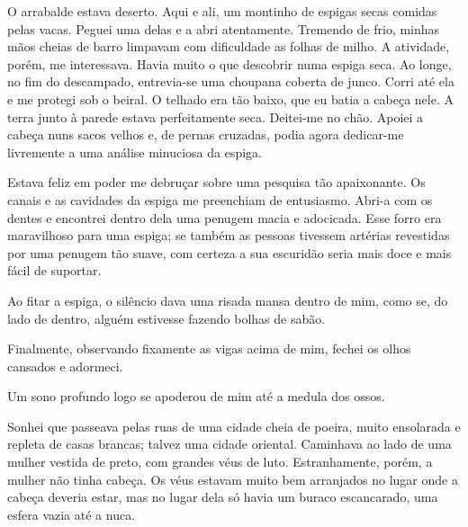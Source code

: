 O arrabalde estava deserto. Aqui e ali, um montinho de espigas secas comidas
pelas vacas. Peguei uma delas e a abri atentamente. Tremendo de frio, minhas
mãos cheias de barro limpavam com dificuldade as folhas de milho. A
atividade, porém, me interessava. Havia muito o que descobrir numa espiga
seca. Ao longe, no fim do descampado, entrevia-se uma choupana coberta de
junco. Corri até ela e me protegi sob o beiral. O telhado era tão baixo, que
eu batia a cabeça nele. A terra junto à parede estava perfeitamente seca.
Deitei-me no chão. Apoiei a cabeça nuns sacos velhos e, de pernas cruzadas,
podia agora dedicar-me livremente a uma análise minuciosa da espiga.

Estava feliz em poder me debruçar sobre uma pesquisa tão apaixonante. Os
canais e as cavidades da espiga me preenchiam de entusiasmo. Abri-a com os
dentes e encontrei dentro dela uma penugem macia e adocicada. Esse forro era
maravilhoso para uma espiga; se também as pessoas tivessem artérias
revestidas por uma penugem tão suave, com certeza a sua escuridão seria mais
doce e mais fácil de suportar.

Ao fitar a espiga, o silêncio dava uma risada mansa dentro de mim, como se, do
lado de dentro, alguém estivesse fazendo bolhas de sabão.



Finalmente, observando fixamente as vigas acima de mim, fechei os olhos
cansados e adormeci.

Um sono profundo logo se apoderou de mim até a medula dos ossos.

Sonhei que passeava pelas ruas de uma cidade cheia de poeira, muito ensolarada
e repleta de casas brancas; talvez uma cidade oriental. Caminhava ao lado de
uma mulher vestida de preto, com grandes véus de luto. Estranhamente, porém,
a mulher não tinha cabeça. Os véus estavam muito bem arranjados no lugar onde
a cabeça deveria estar, mas no lugar dela só havia um buraco escancarado, uma
esfera vazia até a nuca.

